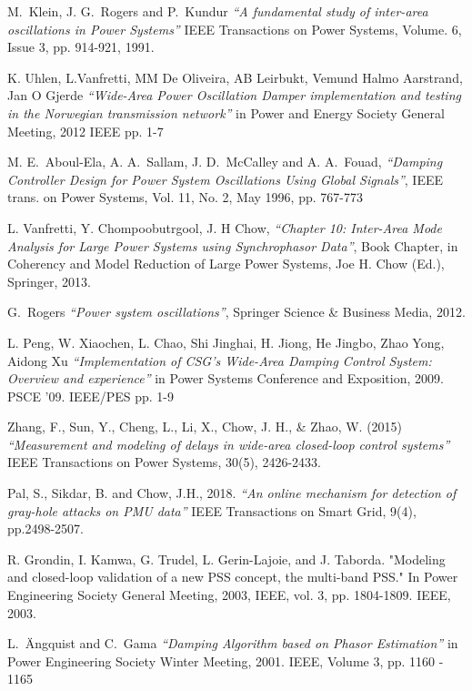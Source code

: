 \documentclass{ieeeaccess}
\begin{document}
\begin{thebibliography}{00}


M.~Klein, J. G.~Rogers and P.~Kundur \emph{``A fundamental study of inter-area oscillations in Power Systems''}  IEEE Transactions on Power Systems, Volume. 6, Issue 3, pp. 914-921, 1991. 

 K. Uhlen, L.Vanfretti, MM De Oliveira, AB Leirbukt, Vemund Halmo Aarstrand, Jan O Gjerde \emph{``Wide-Area Power Oscillation Damper implementation and testing in the Norwegian transmission network''} in Power and Energy Society General Meeting, 2012 IEEE pp. 1-7

  M. E.~Aboul-Ela, A. A.~Sallam, J. D.~McCalley and A. A.~Fouad, \emph{``Damping Controller Design for Power System Oscillations Using Global Signals''}, IEEE trans. on Power Systems, Vol. 11, No. 2, May 1996, pp. 767-773

  L. Vanfretti, Y. Chompoobutrgool, J. H Chow, \emph{``Chapter 10: Inter-Area Mode Analysis for Large Power Systems using Synchrophasor Data''}, Book Chapter, in Coherency and Model Reduction of Large Power Systems, Joe H. Chow (Ed.), Springer, 2013.

 G.~Rogers \emph{``Power system oscillations''}, Springer Science \& Business Media, 2012. 

 L. Peng, W. Xiaochen, L. Chao, Shi Jinghai, H. Jiong, He Jingbo, Zhao Yong, Aidong Xu \emph{``Implementation of CSG's Wide-Area Damping Control System: Overview and experience''} in Power Systems Conference and Exposition, 2009. PSCE '09. IEEE/PES pp. 1-9

 Zhang, F., Sun, Y., Cheng, L., Li, X., Chow, J. H., \& Zhao, W. (2015) \emph{``Measurement and modeling of delays in wide-area closed-loop control systems''} IEEE Transactions on Power Systems, 30(5), 2426-2433.

 Pal, S., Sikdar, B. and Chow, J.H., 2018. \emph{``An online mechanism for detection of gray-hole attacks on PMU data''} IEEE Transactions on Smart Grid, 9(4), pp.2498-2507.

 R. Grondin, I. Kamwa, G. Trudel, L. Gerin-Lajoie, and J. Taborda. "Modeling and closed-loop validation of a new PSS concept, the multi-band PSS." In Power Engineering Society General Meeting, 2003, IEEE, vol. 3, pp. 1804-1809. IEEE, 2003.

L.~\"{A}ngquist and C.~Gama  \emph{``Damping Algorithm based on Phasor Estimation''} in Power Engineering Society Winter Meeting, 2001. IEEE, Volume 3, pp. 1160 - 1165  


\end{thebibliography}
\end{document}
